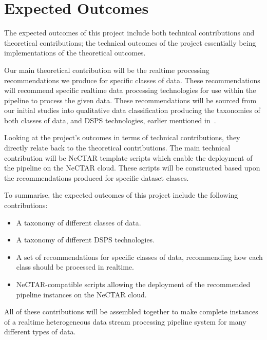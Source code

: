 \documentclass[a4paper,11pt]{article}
\begin{document}



\newpage


\section{Expected Outcomes} %
\label{sec:expected_outcomes}

The expected outcomes of this project include both technical contributions and theoretical contributions; the technical
outcomes of the project essentially being implementations of the theoretical outcomes.

Our main theoretical contribution will be the realtime processing recommendations we produce for specific classes of
data. These recommendations will recommend specific realtime data processing technologies for use within the pipeline to
process the given data. These recommendations will be sourced from our initial studies into qualitative data classification
producing the taxonomies of both classes of data, and DSPS technologies, earlier mentioned in~.

Looking at the project's outcomes in terms of technical contributions, they directly relate back to the theoretical
contributions. The main technical contribution will be NeCTAR template scripts which enable the deployment of the
pipeline on the NeCTAR cloud. These scripts will be constructed based upon the recommendations produced for specific
dataset classes.

To summarise, the expected outcomes of this project include the following contributions:

\begin{itemize}
  \item A taxonomy of different classes of data.
  \item A taxonomy of different DSPS technologies.
  \item A set of recommendations for specific classes of data, recommending how each class should be processed in realtime.
  \item NeCTAR-compatible scripts allowing the deployment of the recommended pipeline instances on the NeCTAR cloud.
\end{itemize}

All of these contributions will be assembled together to make complete instances of a realtime heterogeneous data
stream processing pipeline system for many different types of data.



\newpage



\end{document}
